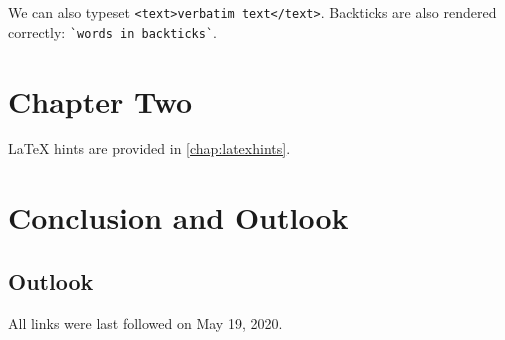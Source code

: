 \documentclass[
  a4paper,  %
  twoside,  %
  bibliography=totoc,
  headsepline,
  cleardoublepage=empty,
  parskip=half,
  draft=false
]{scrbook}
\begin{document}
We can also typeset \verb|<text>verbatim text</text>|.
Backticks are also rendered correctly: \verb|`words in backticks`|.

\chapter{Chapter Two}
\label{chap:k2}

LaTeX hints are provided in \cref{chap:latexhints}.

\blinddocument

\chapter{Conclusion and Outlook}
\label{chap:zusfas}

\section*{Outlook}

\printbibliography

All links were last followed on May 19, 2020.

\appendix


\pagestyle{empty}
\renewcommand*{\chapterpagestyle}{empty}
\Versicherung
\end{document}
